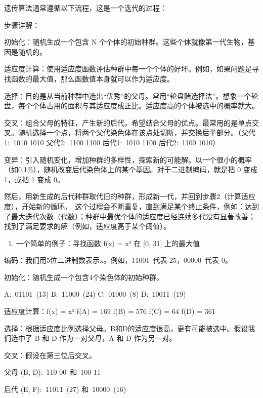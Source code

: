 遗传算法通常遵循以下流程，这是一个迭代的过程：

步骤详解：

初始化：随机生成一个包含 N 个个体的初始种群。这些个体就像第一代生物，基因是随机的。

适应度计算：使用适应度函数评估种群中每一个个体的好坏。例如，如果问题是寻找函数的最大值，那么函数值本身就可以作为适应度。

选择：目的是从当前种群中选出``优秀''的父母。常用``轮盘赌选择法''。想象一个轮盘，每个个体占用的面积与其适应度成正比。适应度高的个体被选中的概率就大。

交叉：组合父母的特征，产生新的后代，希望结合父母的优点。最常用的是单点交叉。随机选择一个点，将两个父代染色体在该点处切断，并交换后半部分。（父代1:~1010 \textbar{} 1010 父代2:~1100 \textbar{} 1100 后代1:~1010 1100 后代2:~1100 1010）

变异：引入随机变化，增加种群的多样性，探索新的可能解。以一个很小的概率（如0.1\%），随机改变后代染色体上的某个基因。对于二进制编码，就是把 0 变成 1，或把 1 变成 0。

然后，用新生成的后代种群取代旧的种群，形成新一代，并回到步骤2（计算适应度），开始新的循环。~这个过程会不断重复，直到满足某个终止条件，例如：达到了最大迭代次数（代数）；种群中最优个体的适应度已经连续多代没有显著改善；找到了满足要求的解（例如，适应度高于某个阈值）。

\begin{enumerate}
\def\labelenumi{\arabic{enumi}.}
\setcounter{enumi}{2}
\tightlist
\item
  一个简单的例子：寻找函数 f(x) = x² 在 {[}0, 31{]} 上的最大值
\end{enumerate}

编码：我们用5位二进制数表示x。例如，11001~代表 25，00000~代表 0。

初始化：随机生成一个包含4个染色体的初始种群。

A:~01101~(13) B:~11000~(24) C:~01000~(8) D:~10011~(19)

适应度计算：f(x) = x² f(A) = 169 f(B) = 576 f(C) = 64 f(D) = 361

选择：根据适应度比例选择父母。B和D的适应度很高，更有可能被选中。假设我们选中了 B 和 D 作为一对父母，A 和 D 作为另一对。

交叉：假设在第三位后交叉。

父母 (B, D):~110 \textbar{} 00~和~100 \textbar{} 11

后代 (E, F):~11011~(27) 和~10000~(16)

